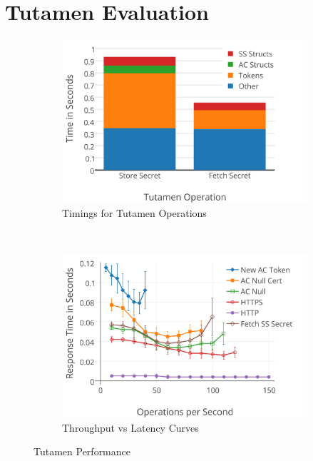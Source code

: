 \section{Tutamen Evaluation}
\label{chap:tutamen:eval}

\begin{figure}[!t]
  \centering
  \begin{subfigure}[t]{0.48\textwidth}
    \includegraphics[width=\columnwidth]{./figs/pre/Tutamen-Chart-Timings.png}
    \caption{Timings for Tutamen Operations}
    \label{fig:tutamen:charts:timings}
  \end{subfigure}
  ~
  \begin{subfigure}[t]{0.48\textwidth}
    \includegraphics[width=\columnwidth]{./figs/pre/Tutamen-Chart-IOPS.png}
    \caption{Throughput vs Latency Curves}
    \label{fig:tutamen:charts:iops}
  \end{subfigure}
  \caption{Tutamen Performance}
  \label{fig:tutamen:charts}
\end{figure}

